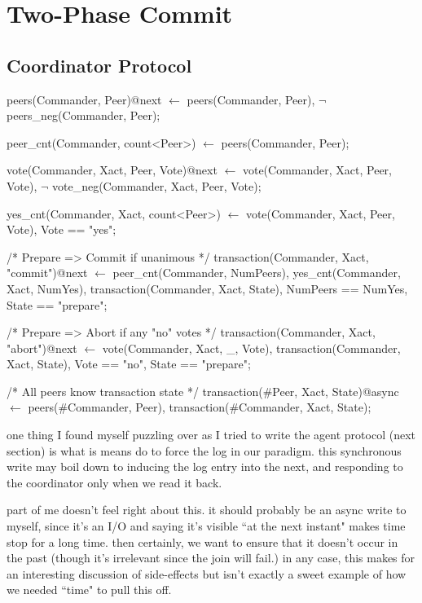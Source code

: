 
\section{Two-Phase Commit}

\subsection{Coordinator Protocol}
\begin{Dedalus}
\small
peers(Commander, Peer)@next \(\leftarrow\)
    peers(Commander, Peer),
    \(\lnot\)peers_neg(Commander, Peer);

peer_cnt(Commander, count<Peer>) \(\leftarrow\)
  peers(Commander, Peer);

vote(Commander, Xact, Peer, Vote)@next \(\leftarrow\)
    vote(Commander, Xact, Peer, Vote),
     \(\lnot\) vote_neg(Commander, Xact, Peer, Vote);

yes_cnt(Commander, Xact, count<Peer>) \(\leftarrow\)
  vote(Commander, Xact, Peer, Vote),
  Vote == "yes";

/* Prepare => Commit if unanimous */
transaction(Commander, Xact, "commit")@next \(\leftarrow\)
  peer_cnt(Commander, NumPeers),
  yes_cnt(Commander, Xact, NumYes),
  transaction(Commander, Xact, State),
  NumPeers == NumYes, State == "prepare";

/* Prepare => Abort if any "no" votes */
transaction(Commander, Xact, "abort")@next \(\leftarrow\)
  vote(Commander, Xact, _, Vote),
  transaction(Commander, Xact, State),
  Vote == "no", State == "prepare";

/* All peers know transaction state */
transaction(#Peer, Xact, State)@async \(\leftarrow\)
  peers(#Commander, Peer),
  transaction(#Commander, Xact, State);
\end{Dedalus}




one thing I found myself puzzling over as I tried to write the agent protocol (next section) is what is means do 
to force the log in our paradigm.  this synchronous write may boil down to inducing the log entry into the next, and responding
to the coordinator only when we read it back.

part of me doesn't feel right about this.  it should probably be an async write to myself, since it's an I/O and saying it's visible ``at the
next instant" makes time stop for a long time.  then certainly, we want to ensure that it doesn't occur in the past (though it's irrelevant
since the join will fail.)  in any case, this makes for an interesting discussion of side-effects but isn't exactly a sweet example of how we
needed ``time" to pull this off.

